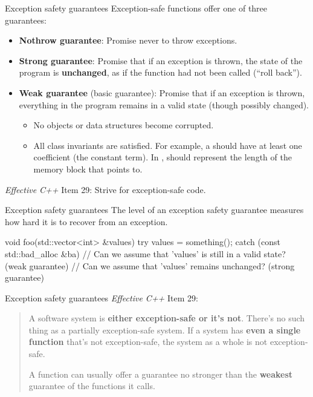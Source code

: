 \documentclass[aspectratio=169]{beamer}
\begin{document}
\begin{frame}{Exception safety guarantees}
  Exception-safe functions offer one of three guarantees:
  \begin{itemize}
    \item \textbf{Nothrow guarantee}: Promise never to throw exceptions.
    \item \textbf{Strong guarantee}: Promise that if an exception is thrown, the state of the program is \textbf{unchanged}, as if the function had not been called (``roll back'').
    \item \textbf{Weak guarantee} (basic guarantee): Promise that if an exception is thrown, everything in the program remains in a valid state (though possibly changed).
    \begin{itemize}
      \item No objects or data structures become corrupted.
      \item All class invariants are satisfied. For example, a  should have at least one coefficient (the constant term). In ,  should represent the length of the memory block that  points to.
    \end{itemize}
  \end{itemize}
  \textit{Effective C++} Item 29: Strive for exception-safe code.
\end{frame}

\begin{frame}[fragile]{Exception safety guarantees}
  The level of an exception safety guarantee measures how hard it is to recover from an exception.
  \begin{cpp}
    void foo(std::vector<int> &values) {
      try {
        values = something();
      } catch (const std::bad_alloc &ba) {
        // Can we assume that 'values' is still in a valid state? (weak guarantee)
        // Can we assume that 'values' remains unchanged? (strong guarantee)
      }
    }
  \end{cpp}
\end{frame}

\begin{frame}{Exception safety guarantees}
  \textit{Effective C++} Item 29:
  \begin{quotation}
    A software system is \textbf{either exception-safe or it's not}. There's no such thing as a partially exception-safe system. If a system has \textbf{even a single function} that's not exception-safe, the system as a whole is not exception-safe.

    A function can usually offer a guarantee no stronger than the \textbf{weakest} guarantee of the functions it calls.
  \end{quotation}
\end{frame}
\end{document}
